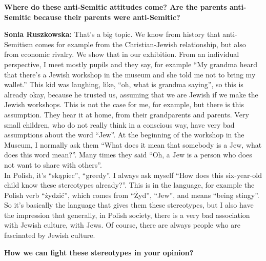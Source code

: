 \textbf{Where do these anti-Semitic attitudes come? Are the parents anti-Semitic because their parents were anti-Semitic?} 

\textbf{Sonia Ruszkowska:} That’s a big topic. We know from history that anti-Semitism comes for example from the Christian-Jewish relationship, but also from economic rivalry. We show that in our exhibition. From an individual perspective, I meet mostly pupils and they say, for example ``My grandma heard that there’s a Jewish workshop in the museum and she told me not to bring my wallet.'' This kid was laughing, like, ``oh, what is grandma saying'', so this is already okay, because he trusted us, assuming that we are Jewish if we make the Jewish workshops. This is not the case for me, for example, but there is this assumption. They hear it at home, from their grandparents and parents. Very small children, who do not really think in a conscious way, have very bad assumptions about the word ``Jew''. At the beginning of the workshop in the Museum, I normally ask them ``What does it mean that somebody is a Jew, what does this word mean?''. Many times they said ``Oh, a Jew is a person who does not want to share with others''.\\ 
In Polish, it’s ``skąpiec'', ``greedy''. I always ask myself ``How does this six-year-old child know these stereotypes already?''. This is in the language, for example the Polish verb ``żydzić'', which comes from ``Żyd'', ``Jew'', and means ``being stingy''. So it’s basically the language that gives them these stereotypes, but I also have the impression that generally, in Polish society, there is a very bad association with Jewish culture, with Jews. Of course, there are always people who are fascinated by Jewish culture. 

\textbf{How we can fight these stereotypes in your opinion?}

